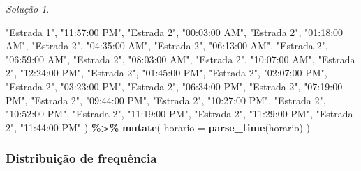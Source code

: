\documentclass[
]{latex/krantz}
\newenvironment{Shaded}{\begin{snugshade}}{\end{snugshade}}
\newcommand{\AttributeTok}[1]{\textcolor[rgb]{0.13,0.29,0.53}{#1}}
\newcommand{\FunctionTok}[1]{\textcolor[rgb]{0.13,0.29,0.53}{\textbf{#1}}}
\newcommand{\NormalTok}[1]{#1}
\newcommand{\SpecialCharTok}[1]{\textcolor[rgb]{0.81,0.36,0.00}{\textbf{#1}}}
\newcommand{\StringTok}[1]{\textcolor[rgb]{0.31,0.60,0.02}{#1}}
\theoremstyle{definition}
\theoremstyle{definition}
\theoremstyle{definition}
\theoremstyle{definition}
\theoremstyle{remark}
\newtheorem*{solution}{Solução}
\begin{document}
\begin{solution}
\begin{Shaded}
\begin{Highlighting}[]
  \StringTok{"Estrada 1"}\NormalTok{, }\StringTok{"11:57:00 PM"}\NormalTok{,}
  \StringTok{"Estrada 2"}\NormalTok{, }\StringTok{"00:03:00 AM"}\NormalTok{,}
  \StringTok{"Estrada 2"}\NormalTok{, }\StringTok{"01:18:00 AM"}\NormalTok{,}
  \StringTok{"Estrada 2"}\NormalTok{, }\StringTok{"04:35:00 AM"}\NormalTok{,}
  \StringTok{"Estrada 2"}\NormalTok{, }\StringTok{"06:13:00 AM"}\NormalTok{,}
  \StringTok{"Estrada 2"}\NormalTok{, }\StringTok{"06:59:00 AM"}\NormalTok{, }
  \StringTok{"Estrada 2"}\NormalTok{, }\StringTok{"08:03:00 AM"}\NormalTok{,}
  \StringTok{"Estrada 2"}\NormalTok{, }\StringTok{"10:07:00 AM"}\NormalTok{,}
  \StringTok{"Estrada 2"}\NormalTok{, }\StringTok{"12:24:00 PM"}\NormalTok{,}
  \StringTok{"Estrada 2"}\NormalTok{, }\StringTok{"01:45:00 PM"}\NormalTok{,}
  \StringTok{"Estrada 2"}\NormalTok{, }\StringTok{"02:07:00 PM"}\NormalTok{, }
  \StringTok{"Estrada 2"}\NormalTok{, }\StringTok{"03:23:00 PM"}\NormalTok{, }
  \StringTok{"Estrada 2"}\NormalTok{, }\StringTok{"06:34:00 PM"}\NormalTok{, }
  \StringTok{"Estrada 2"}\NormalTok{, }\StringTok{"07:19:00 PM"}\NormalTok{, }
  \StringTok{"Estrada 2"}\NormalTok{, }\StringTok{"09:44:00 PM"}\NormalTok{, }
  \StringTok{"Estrada 2"}\NormalTok{, }\StringTok{"10:27:00 PM"}\NormalTok{, }
  \StringTok{"Estrada 2"}\NormalTok{, }\StringTok{"10:52:00 PM"}\NormalTok{,}
  \StringTok{"Estrada 2"}\NormalTok{, }\StringTok{"11:19:00 PM"}\NormalTok{,}
  \StringTok{"Estrada 2"}\NormalTok{, }\StringTok{"11:29:00 PM"}\NormalTok{,}
  \StringTok{"Estrada 2"}\NormalTok{, }\StringTok{"11:44:00 PM"}
\NormalTok{) }\SpecialCharTok{\%\textgreater{}\%}
  \FunctionTok{mutate}\NormalTok{(}
    \AttributeTok{horario =} \FunctionTok{parse\_time}\NormalTok{(horario)}
\NormalTok{  )}
\end{Highlighting}
\end{Shaded}

\hypertarget{distribuiuxe7uxe3o-de-frequuxeancia}{%
\subsubsection*{Distribuição de frequência}\label{distribuiuxe7uxe3o-de-frequuxeancia}}


\end{solution}
\end{document}
